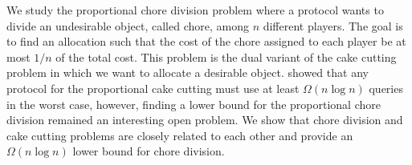 We study the proportional chore division problem where a protocol wants to divide an undesirable object, called chore, among $n$ different players. The goal is to find an allocation such that the cost of the chore assigned to each player be at most $1/n$ of the total cost. This problem is the dual variant of the cake cutting problem in which we want to allocate a desirable object.  showed that any protocol for the proportional cake cutting must use at least $\Omega(n \log n)$ queries in the worst case, however, finding a lower bound for the proportional chore division remained an interesting open problem. We show that chore division and cake cutting problems are closely related to each other and provide an $\Omega(n \log n)$ lower bound for chore division.
